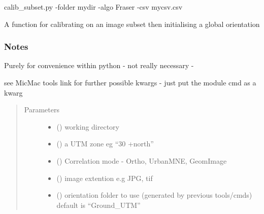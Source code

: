 \documentclass[letterpaper,10pt,english]{sphinxmanual}
\begin{document}
calib\_subset.py -folder mydir -algo Fraser  -csv mycsv.csv

\begin{fulllineitems}
\label{\detokenize{pycmac:utilities.calib_subset}}
A function for calibrating on an image subset then initialising a global
orientation
\subsubsection*{Notes}

Purely for convenience within python - not really necessary -

see MicMac tools link for further possible kwargs - just put the module cmd as a kwarg
\begin{quote}\begin{description}
\item[{Parameters}] \leavevmode\begin{itemize}
\item {} 
 () \textendash{} working directory

\item {} 
 () \textendash{} a UTM zone eg “30 +north”

\item {} 
 () \textendash{} Correlation mode - Ortho, UrbanMNE, GeomImage

\item {} 
 () \textendash{} image extention e.g JPG, tif

\item {} 
 () \textendash{} orientation folder to use (generated by previous tools/cmds)
default is “Ground\_UTM”

\end{itemize}

\end{description}\end{quote}

\end{fulllineitems}
\end{document}
